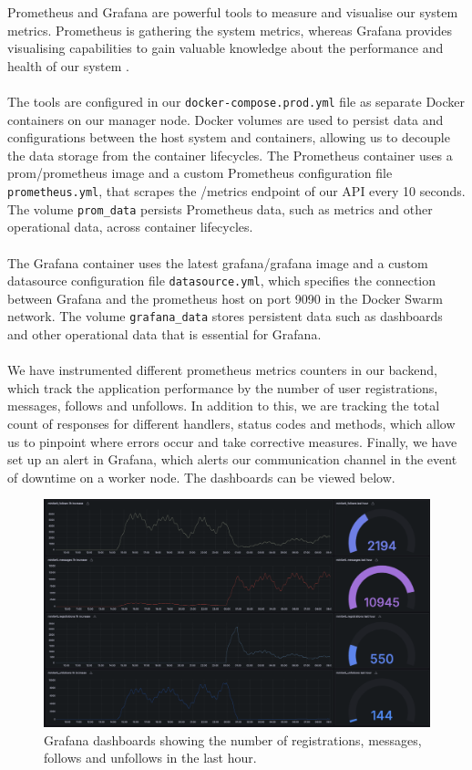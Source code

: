 Prometheus and Grafana are powerful tools to measure and visualise our system metrics. Prometheus is gathering the system metrics, whereas Grafana provides visualising capabilities to gain valuable knowledge about the performance and health of our system  \cite{slides}.
\\
\\
The tools are configured in our \texttt{docker-compose.prod.yml} file as separate Docker containers on our manager node. Docker volumes are used to persist data and configurations between the host system and containers, allowing us to decouple the data storage from the container lifecycles. The Prometheus container uses a prom/prometheus image and a custom Prometheus configuration file \texttt{prometheus.yml}, that scrapes the /metrics endpoint of our API every 10 seconds. The volume \texttt{prom\_data} persists Prometheus data, such as metrics and other operational data, across container lifecycles.
\\
\\
The Grafana container uses the latest grafana/grafana image and a custom datasource configuration file \texttt{datasource.yml}, which specifies the connection between Grafana and the prometheus host on port 9090 in the Docker Swarm network. The volume \texttt{grafana\_data} stores persistent data such as dashboards and other operational data that is essential for Grafana.
\\
\\
We have instrumented different prometheus metrics counters in our backend, which track the application performance by the number of user registrations, messages, follows and unfollows. In addition to this, we are tracking the total count of responses for different handlers, status codes and methods, which allow us to pinpoint where errors occur and take corrective measures. Finally, we have set up an alert in Grafana, which alerts our communication channel in the event of downtime on a worker node. The dashboards can be viewed below. 

 \begin{figure}[H]
    \centering
    \includegraphics[scale=.3]{img/increases.png}
    \caption{Grafana dashboards showing the number of registrations, messages, follows and unfollows in the last hour.}
\end{figure}

